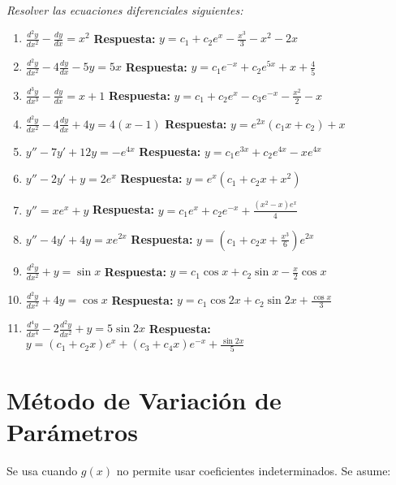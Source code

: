 \textit{Resolver las ecuaciones diferenciales siguientes:}

\begin{enumerate}
    \item \( \frac{d^2 y}{dx^2} - \frac{dy}{dx} = x^2 \)  
    \textbf{Respuesta:} \( y = c_1 + c_2 e^x - \frac{x^3}{3} - x^2 - 2x \)

    \item \( \frac{d^2 y}{dx^2} - 4 \frac{dy}{dx} - 5y = 5x \)  
    \textbf{Respuesta:} \( y = c_1 e^{-x} + c_2 e^{5x} + x + \frac{4}{5} \)

    \item \( \frac{d^3 y}{dx^3} - \frac{dy}{dx} = x+1 \)  
    \textbf{Respuesta:} \( y = c_1 + c_2 e^x - c_3 e^{-x} - \frac{x^2}{2} - x \)

    \item \( \frac{d^2 y}{dx^2} - 4 \frac{dy}{dx} + 4y = 4(x-1) \)  
    \textbf{Respuesta:} \( y = e^{2x} (c_1 x + c_2) + x \)

    \item \( y'' - 7y' + 12y = -e^{4x} \)  
    \textbf{Respuesta:} \( y = c_1 e^{3x} + c_2 e^{4x} - x e^{4x} \)

    \item \( y'' - 2y' + y = 2e^x \)  
    \textbf{Respuesta:} \( y = e^x (c_1 + c_2 x + x^2) \)

    \item \( y'' = x e^x + y \)  
    \textbf{Respuesta:} \( y = c_1 e^x + c_2 e^{-x} + \frac{(x^2 - x) e^x}{4} \)

    \item \( y'' - 4y' + 4y = x e^{2x} \)  
    \textbf{Respuesta:} \( y = (c_1 + c_2 x + \frac{x^3}{6}) e^{2x} \)

    \item \( \frac{d^2 y}{dx^2} + y = \sin x \)  
    \textbf{Respuesta:} \( y = c_1 \cos x + c_2 \sin x - \frac{x}{2} \cos x \)

    \item \( \frac{d^2 y}{dx^2} + 4y = \cos x \)  
    \textbf{Respuesta:} \( y = c_1 \cos 2x + c_2 \sin 2x + \frac{\cos x}{3} \)

    \item \( \frac{d^4 y}{dx^4} - 2 \frac{d^2 y}{dx^2} + y = 5 \sin 2x \)  
    \textbf{Respuesta:} \( y = (c_1 + c_2 x)e^x + (c_3 + c_4 x)e^{-x} + \frac{\sin 2x}{5} \)
\end{enumerate}

\section{Método de Variación de Parámetros}
Se usa cuando \( g(x) \) no permite usar coeficientes indeterminados. Se asume:

